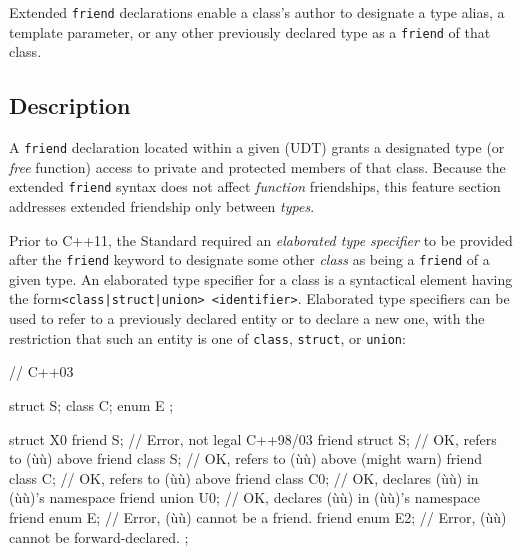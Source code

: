 
\setcounter{table}{0}
\setcounter{footnote}{0}
\setcounter{lstlisting}{0}


Extended \lstinline!friend! declarations enable a class's author to
designate a type alias, a template parameter, or any other previously
declared type as a \lstinline!friend! of that class.

\subsection[Description]{Description}\label{description-extendedfriend}

A \lstinline!friend! declaration located within a given
 (UDT) grants a designated type (or
\emph{free} function) access to private and protected members of that
class. Because the extended \lstinline!friend! syntax does not affect
\emph{function} friendships, this feature section addresses extended
friendship only between \emph{types}.

Prior to C++11, the Standard required an \emph{elaborated type
specifier} to be provided after the \lstinline!friend! keyword to designate
some other \emph{class} as being a \lstinline!friend! of a given type. An
elaborated type specifier for a class is a syntactical element having the form\linebreak[4]
\mbox{\lstinline!<class|struct|union>!~\lstinline!<identifier>!}. Elaborated
type specifiers can be used to refer to a previously declared entity or
to declare a new one, with the restriction that such an entity is
one of \lstinline!class!, \lstinline!struct!, or \lstinline!union!:

\begin{emcppslisting}
// C++03

struct S;
class C;
enum E { };

struct X0
{
    friend S;         // Error, not legal C++98/03
    friend struct S;  // OK, refers to (ù{}ù) above
    friend class S;   // OK, refers to (ù{}ù) above (might warn)
    friend class C;   // OK, refers to (ù{}ù) above
    friend class C0;  // OK, declares (ù{}ù) in (ù{}ù)'s namespace
    friend union U0;  // OK, declares (ù{}ù) in (ù{}ù)'s namespace
    friend enum E;    // Error, (ù{}ù) cannot be a friend.
    friend enum E2;   // Error, (ù{}ù) cannot be forward-declared.
};
\end{emcppslisting}
    
